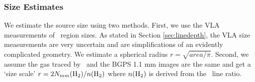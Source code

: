 



\subsubsection{Size Estimates}
\label{sec:sizecomp}

We estimate the source size using two methods.  First, we use the VLA
measurements of \uchii\ region sizes.  As stated in Section
\ref{sec:linedepth}, the VLA size measurements are very uncertain and are
simplifications of an evidently complicated geometry.  We estimate a spherical
radius $r=\sqrt{area/\pi}$.  Second, we assume the gas traced by \formaldehyde\
and the BGPS 1.1 mm images are the same and get a `size scale'
$r=2 N_{mm}(\textrm{H}_{2})/n(\textrm{H}_{2})$ where $n(\textrm{H}_{2})$ is derived from the \formaldehyde\ line
ratio.

